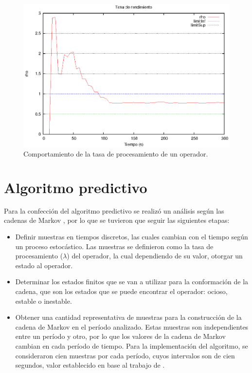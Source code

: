 \begin{figure}[ht!]
  \centering
    \includegraphics[scale=0.8]{images/Umbrales.eps}
  \caption{Comportamiento de la tasa de procesamiento de un operador.}
  \label{fig:umbrales}
\end{figure}


\section{Algoritmo predictivo}
Para la confección del algoritmo predictivo se realizó un análisis según las cadenas de Markov \citep{ching2006markov}, por lo que se tuvieron que seguir las siguientes etapas:

\begin{itemize}
	\item Definir muestras en tiempos discretos, las cuales cambian con el tiempo según un proceso estocástico. Las muestras se definieron como la tasa de procesamiento ($\lambda$) del operador, la cual dependiendo de su valor, otorgar un estado al operador.
	\item Determinar los estados finitos que se van a utilizar para la conformación de la cadena, que son los estados que se puede encontrar el operador: ocioso, estable o inestable.
	\item Obtener una cantidad representativa de muestras para la construcción de la cadena de Markov en el período analizado. Estas muestras son independientes entre un período y otro, por lo que los valores de la cadena de Markov cambian en cada período de tiempo. Para la implementación del algoritmo, se consideraron cien muestras por cada período, cuyos intervalos son de cien segundos, valor establecido en base al trabajo de \citep{GongGW10}.
\end{itemize}

